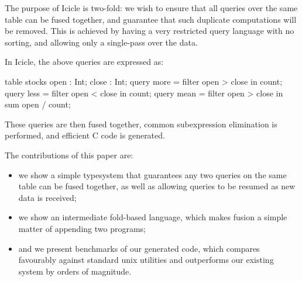 The purpose of Icicle is two-fold: we wish to ensure that all queries over the same table can be fused together, and guarantee that such duplicate computations will be removed.
This is achieved by having a very restricted query language with no sorting, and allowing only a single-pass over the data.

In Icicle, the above queries are expressed as:
\begin{code}
table stocks { open : Int; close : Int; }
query more = filter open > close in count;
query less = filter open < close in count;
query mean = filter open > close in sum open / count;
\end{code}

These queries are then fused together, common subexpression elimination is performed, and efficient C code is generated.

The contributions of this paper are:
\begin{itemize}
\item
we show a simple typesystem that guarantees any two queries on the same table can be fused together, as well as allowing queries to be resumed as new data is received;

\item
we show an intermediate fold-based language, which makes fusion a simple matter of appending two programs;

\item
and we present benchmarks of our generated code, which compares favourably against standard unix utilities and outperforms our existing system by orders of magnitude.
\end{itemize}

